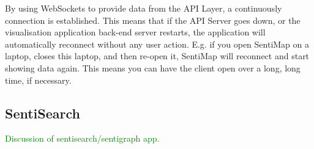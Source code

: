 By using WebSockets to provide data from the API Layer, a continuously connection is established. This means that if the API Server goes down, or the visualisation application back-end server restarts, the application will automatically reconnect without any user action. E.g. if you open SentiMap on a laptop, closes this laptop, and then re-open it, SentiMap will reconnect and start showing data again. This means you can have the client open over a long, long time, if necessary.   

\subsection{SentiSearch}

\textcolor{green}{Discussion of sentisearch/sentigraph app.}


%
%
%
%
%
%
%
%
%
%
